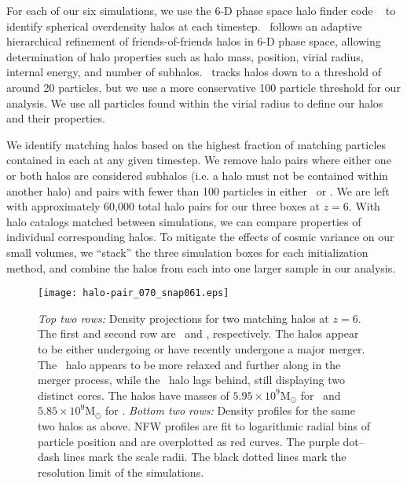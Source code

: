 For each of our six simulations, we use the 6-D phase space halo finder code \rockstar\ \citep{2013ApJ...762..109B} to identify spherical overdensity halos at each timestep.  \rockstar\ follows an adaptive hierarchical refinement of friends-of-friends halos in 6-D phase space, allowing determination of halo properties such as halo mass, position, virial radius, internal energy, and number of subhalos.  \rockstar\ tracks halos down to a threshold of around 20 particles, but we use a more conservative 100 particle threshold for our analysis.  We use all particles found within the virial radius to define our halos and their properties.






We identify matching halos based on the highest fraction of matching particles contained in each at any given timestep.  We remove halo pairs where either one or both halos are considered subhalos (i.e. a halo must not be contained within another halo) and pairs with fewer than 100 particles in either \lpt\ or \za.  We are left with approximately 60,000 total halo pairs for our three boxes at $z = 6$.  With halo catalogs matched between simulations, we can compare properties of individual corresponding halos.  To mitigate the effects of cosmic variance on our small volumes, we ``stack'' the three simulation boxes for each initialization method, and combine the halos from each into one larger sample in our analysis.






\begin{figure}[t]
    \centering
    \texttt{[image: halo-pair\_070\_snap061.eps]}
	\caption[Comparison of matched \lpt\ and \za\ halos]{\footnotesize \textit{Top two rows:}  Density projections for two matching halos at $z = 6$.  The first and second row are \lpt\ and \za, respectively.  The halos appear to be either undergoing or have recently undergone a major merger.  The \lpt\ halo appears to be more relaxed and further along in the merger process, while the \za\ halo lags behind, still displaying two distinct cores.  The halos have masses of $5.95 \times 10^{9} \textrm{M}_{\odot}$ for \lpt\ and $5.85 \times 10^{9} \textrm{M}_{\odot}$ for \za.  \textit{Bottom two rows:}  Density profiles for the same two halos as above.  NFW profiles are fit to logarithmic radial bins of particle position and are overplotted as red curves.  The purple dot--dash lines mark the scale radii.  The black dotted lines mark the resolution limit of the simulations.}
    \label{fig:halo-pair}
\end{figure}

